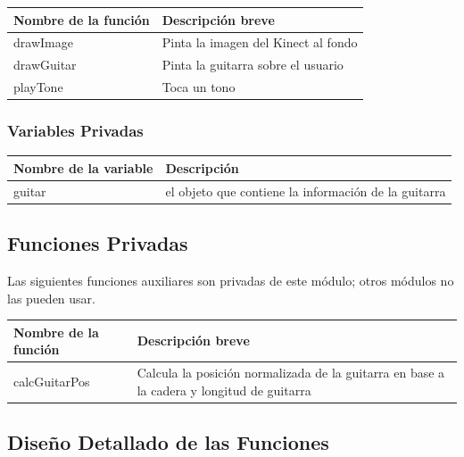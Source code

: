 \documentclass[a4paper,12pt]{article}
\begin{document}
\begin{tabular}{| p{30mm} | p{10cm} |}
        \hline
        \textbf{Nombre de la \mbox{función}} & \textbf{Descripción breve} \\
        \hline
        drawImage & Pinta la imagen del Kinect al fondo \\
        \hline
        drawGuitar & Pinta la guitarra sobre el usuario \\
        \hline
        playTone & Toca un tono \\
        \hline
\end{tabular}

\subsubsection{Variables Privadas}
\begin{tabular}{| p{30mm} | p{10cm} |}
        \hline
        \textbf{Nombre de la \mbox{variable}} & \textbf{Descripción} \\
        \hline
        guitar & el objeto que contiene la información de la guitarra\\
        \hline
\end{tabular}
\subsection{Funciones Privadas}
Las siguientes funciones auxiliares son privadas de este módulo; otros módulos
no las pueden usar.~\\

\begin{tabular}{| p{30mm} | p{10cm} |}
        \hline
        \textbf{Nombre de la \mbox{función}} & \textbf{Descripción breve} \\
        \hline
        calcGuitarPos & Calcula la posición normalizada de la guitarra en base a la cadera y longitud de guitarra \\
        \hline
\end{tabular}
\subsection{Diseño Detallado de las Funciones}
\end{document}
